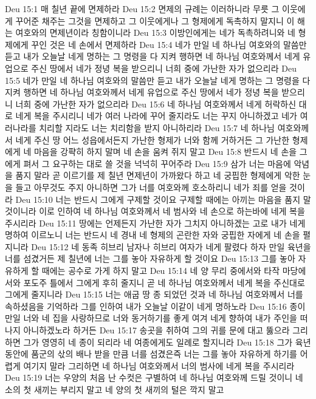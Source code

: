 Deu 15:1  매 칠년 끝에 면제하라
Deu 15:2  면제의 규례는 이러하니라 무릇 그 이웃에게 꾸어준 채주는 그것을 면제하고 그 이웃에게나 그 형제에게 독촉하지 말지니 이 해는 여호와의 면제년이라 칭함이니라
Deu 15:3  이방인에게는 네가 독촉하려니와 네 형제에게 꾸인 것은 네 손에서 면제하라
Deu 15:4  네가 만일 네 하나님 여호와의 말씀만 듣고 내가 오늘날 네게 명하는 그 명령을 다 지켜 행하면 네 하나님 여호와께서 네게 유업으로 주신 땅에서 네가 정녕 복을 받으리니 너희 중에 가난한 자가 없으리라
Deu 15:5  네가 만일 네 하나님 여호와의 말씀만 듣고 내가 오늘날 네게 명하는 그 명령을 다 지켜 행하면 네 하나님 여호와께서 네게 유업으로 주신 땅에서 네가 정녕 복을 받으리니 너희 중에 가난한 자가 없으리라
Deu 15:6  네 하나님 여호와께서 네게 허락하신 대로 네게 복을 주시리니 네가 여러 나라에 꾸어 줄지라도 너는 꾸지 아니하겠고 네가 여러나라를 치리할 지라도 너는 치리함을 받지 아니하리라
Deu 15:7  네 하나님 여호와께서 네게 주신 땅 어느 성읍에서든지 가난한 형제가 너와 함께 거하거든 그 가난한 형제에게 네 마음을 강퍅히 하지 말며 네 손을 움켜 쥐지 말고
Deu 15:8  반드시 네 손을 그에게 펴서 그 요구하는 대로 쓸 것을 넉넉히 꾸어주라
Deu 15:9  삼가 너는 마음에 악념을 품지 말라 곧 이르기를 제 칠년 면제년이 가까왔다 하고 네 궁핍한 형제에게 악한 눈을 들고 아무것도 주지 아니하면 그가 너를 여호와께 호소하리니 네가 죄를 얻을 것이라
Deu 15:10  너는 반드시 그에게 구제할 것이요 구제할 때에는 아끼는 마음을 품지 말 것이니라 이로 인하여 네 하나님 여호와께서 네 범사와 네 손으로 하는바에 네게 복을 주시리라
Deu 15:11  땅에는 언제든지 가난한 자가 그치지 아니하겠는 고로 내가 네게 명하여 이르노니 너는 반드시 네 경내 네 형제의 곤란한 자와 궁핍한 자에게 네 손을 펼지니라
Deu 15:12  네 동족 히브리 남자나 히브리 여자가 네게 팔렸다 하자 만일 육년을 너를 섬겼거든 제 칠년에 너는 그를 놓아 자유하게 할 것이요
Deu 15:13  그를 놓아 자유하게 할 때에는 공수로 가게 하지 말고
Deu 15:14  네 양 무리 중에서와 타작 마당에서와 포도주 틀에서 그에게 후히 줄지니 곧 네 하나님 여호와께서 네게 복을 주신대로 그에게 줄지니라
Deu 15:15  너는 애굽 땅 종 되었던 것과 네 하나님 여호와께서 너를 속하셨음을 기억하라 그를 인하여 내가 오늘날 이같이 네게 명하노라
Deu 15:16  종이 만일 너와 네 집을 사랑하므로 너와 동거하기를 좋게 여겨 네게 향하여 내가 주인을 떠나지 아니하겠노라 하거든
Deu 15:17  송곳을 취하여 그의 귀를 문에 대고 뚫으라 그리하면 그가 영영히 네 종이 되리라 네 여종에게도 일례로 할지니라
Deu 15:18  그가 육년 동안에 품군의 삯의 배나 받을 만큼 너를 섬겼은즉 너는 그를 놓아 자유하게 하기를 어렵게 여기지 말라 그리하면 네 하나님 여호와께서 너의 범사에 네게 복을 주시리라
Deu 15:19  너는 우양의 처음 난 수컷은 구별하여 네 하나님 여호와께 드릴 것이니 네 소의 첫 새끼는 부리지 말고 네 양의 첫 새끼의 털은 깍지 말고
